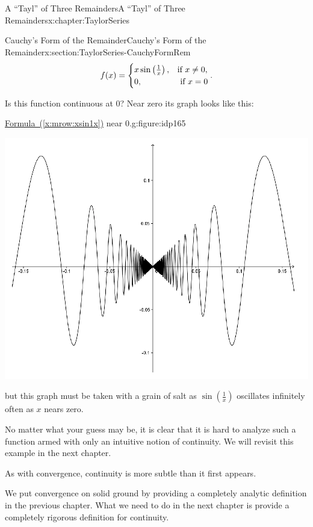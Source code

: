 \begin{chapterptx}{A ``Tayl'' of Three Remainders}{}{A ``Tayl'' of Three Remainders}{}{}{x:chapter:TaylorSeries}
\begin{sectionptx}{Cauchy's Form of the Remainder}{}{Cauchy's Form of the Remainder}{}{}{x:section:TaylorSeries-CauchyFormRem}
		\begin{align}
			f(x)= 
			\begin{cases}
				x\sin\left(\frac{1}{x}\right),& \text{if } x\neq 0,\\
				0, & \text{ if } x=0 
			\end{cases} \text{.}\label{x:mrow:xsin1x}
		\end{align}
		\par
		Is this function continuous at 0?  Near zero its graph looks like this:%
		\begin{figureptx}{\hyperref[x:mrow:xsin1x]{Formula~({\xreffont\ref{x:mrow:xsin1x}})} near \(0\).}{g:figure:idp165}{}%
			\begin{image}{0}{1}{0}%
				\includegraphics[width=\linewidth]{external/images/Ch5fig4.png}
			\end{image}%
			\tcblower
		\end{figureptx}%
		but this graph must be taken with a grain of salt as \(\sin
		\left(\frac{1}{x}\right)\) oscillates infinitely often as \(x\) nears zero.%
		\par
		No matter what your guess may be, it is clear that it is hard to analyze such a function armed with only an intuitive notion of continuity.  We will revisit this example in the next chapter.%
		\par
		As with convergence, continuity is more subtle than it first appears.%
		\par
		We put convergence on solid ground by providing a completely analytic definition in the previous chapter.  What we need to do in the next chapter is provide a completely rigorous definition for continuity.%

\end{sectionptx}
\end{chapterptx}
